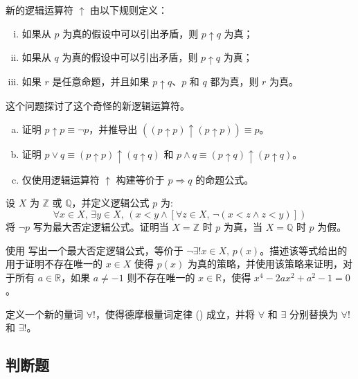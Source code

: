 \begin{chapex}
新的逻辑运算符 $\uparrow$ 由以下规则定义：
\begin{enumerate}[(i)]
\item 如果从 $p$ 为真的假设中可以引出矛盾，则 $p \uparrow q$ 为真；
\item 如果从 $q$ 为真的假设中可以引出矛盾，则 $p \uparrow q$ 为真；
\item 如果 $r$ 是任意命题，并且如果 $p \uparrow q$、$p$ 和 $q$ 都为真，则 $r$ 为真。
\end{enumerate}

这个问题探讨了这个奇怪的新逻辑运算符。
\begin{enumerate}[(a)]
\item 证明 $p \uparrow p \equiv \neg p$，并推导出 $((p \uparrow p) \uparrow (p \uparrow p)) \equiv p$。
\item 证明 $p \vee q \equiv (p \uparrow p) \uparrow (q \uparrow q)$ 和 $p \wedge q \equiv (p \uparrow q) \uparrow (p \uparrow q)$。
\item 仅使用逻辑运算符 $\uparrow$ 构建等价于 $p \Rightarrow q$ 的命题公式。
\end{enumerate}
\end{chapex}

\begin{chapex}
设 $X$ 为 $\mathbb{Z}$ 或 $\mathbb{Q}$，并定义逻辑公式 $p$ 为:
$$\forall x \in X,\, \exists y \in X,\, (x<y \wedge [\forall z \in X,\, \neg (x<z \wedge z<y)])$$
将 $\neg p$ 写为最大否定逻辑公式。证明当 $X = \mathbb{Z}$ 时 $p$ 为真，当 $X = \mathbb{Q}$ 时 $p$ 为假。
\end{chapex}

\begin{chapex}
使用  写出一个最大否定逻辑公式，等价于 $\neg \exists! x \in X,\, p(x)$。描述该等式给出的用于证明不存在唯一的 $x \in X$ 使得 $p(x)$ 为真的策略，并使用该策略来证明，对于所有 $a \in \mathbb{R }$，如果 $a \ne -1$ 则不存在唯一的 $x \in \mathbb{R}$，使得 $x^4-2ax^2+a^2-1=0$。
\end{chapex}

\begin{chapex}
定义一个新的量词 $\forall !$，使得德摩根量词定律 () 成立，并将 $\forall$ 和 $\exists$ 分别替换为 $\forall!$ 和 $\exists!$。
\end{chapex}

\subsection*{判断题}

